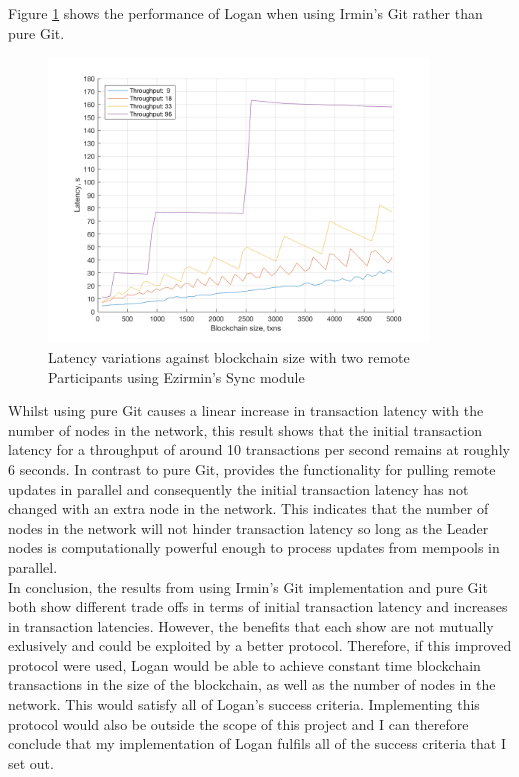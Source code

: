 \documentclass[12pt,a4paper,twoside,openright]{report}
\begin{document}
	Figure \ref{figs:tworemsirmin} shows the performance of Logan when using Irmin's Git rather than pure Git.
	\begin{figure}
		\centering
		\includegraphics[width=0.9\textwidth]{figs/latencies_sizes_throughputs_irmin_git.png}
		\caption{Latency variations against blockchain size with two remote Participants using Ezirmin's Sync module}
		\label{figs:tworemsirmin}
	\end{figure}
	Whilst using pure Git causes a linear increase in transaction latency with the number of nodes in the network, this result shows that the initial transaction latency for a throughput of around 10 transactions per second remains at roughly 6 seconds. 
	In contrast to pure Git, provides the functionality for pulling remote updates in parallel and consequently the initial transaction latency has not changed with an extra node in the network.
	This indicates that the number of nodes in the network will not hinder transaction latency so long as the Leader nodes is computationally powerful enough to process updates from mempools in parallel.\\

	In conclusion, the results from using Irmin's Git implementation and pure Git both show different trade offs in terms of initial transaction latency and increases in transaction latencies. 
	However, the benefits that each show are not mutually exlusively and could be exploited by
	 a better protocol.
	Therefore, if this improved protocol were used, Logan would be able to achieve constant time blockchain transactions in the size of the blockchain, as well as the number of nodes in the network.
	This would satisfy all of Logan's success criteria.
	Implementing this protocol would also be outside the scope of this project and I can therefore conclude that my implementation of Logan fulfils all of the success criteria that I set out.
\end{document}
